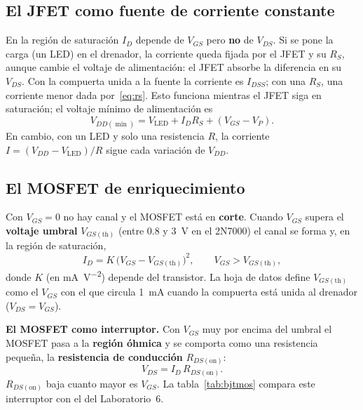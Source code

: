 \documentclass[11pt,a4paper]{article}
\begin{document}
\subsection{El JFET como fuente de corriente constante}
\label{sec:fuente}
En la región de saturación $I_D$ depende de $V_{GS}$ pero \textbf{no} de $V_{DS}$. Si se pone
la carga (un LED) en el drenador, la corriente queda fijada por el JFET y su $R_S$, aunque cambie
el voltaje de alimentación: el JFET absorbe la diferencia en su $V_{DS}$. Con la compuerta
unida a la fuente la corriente es $I_{DSS}$; con una $R_S$, una corriente menor dada
por~\eqref{eq:rs}. Esto funciona mientras el JFET siga en saturación; el voltaje mínimo de
alimentación es
\begin{equation}
  V_{DD(\min)} = V_{\text{LED}} + I_D R_S + (V_{GS} - V_P).
  \label{eq:vddmin}
\end{equation}
En cambio, con un LED y solo una resistencia $R$, la corriente
$I = (V_{DD} - V_{\text{LED}})/R$ sigue cada variación de $V_{DD}$.

\subsection{El MOSFET de enriquecimiento}
Con $V_{GS} = 0$ no hay canal y el MOSFET está en \textbf{corte}. Cuando $V_{GS}$ supera el
\textbf{voltaje umbral} $V_{GS(\text{th})}$ (entre \num{0.8} y \qty{3}{\volt} en el 2N7000) el
canal se forma y, en la región de saturación,
\begin{equation}
  I_D = K\,\bigl(V_{GS} - V_{GS(\text{th})}\bigr)^{2},
  \qquad V_{GS} > V_{GS(\text{th})},
  \label{eq:mos}
\end{equation}
donde $K$ (en \unit{\milli\ampere\per\volt\squared}) depende del transistor. La hoja de datos
define $V_{GS(\text{th})}$ como el $V_{GS}$ con el que circula \qty{1}{\milli\ampere} cuando la
compuerta está unida al drenador ($V_{DS} = V_{GS}$).

\noindent\textbf{El MOSFET como interruptor.} Con $V_{GS}$ muy por encima del umbral el
MOSFET pasa a la \textbf{región óhmica} y se comporta como una resistencia pequeña, la
\textbf{resistencia de conducción} $R_{DS(\text{on})}$:
\begin{equation}
  V_{DS} = I_D\,R_{DS(\text{on})}.
  \label{eq:rdson}
\end{equation}
$R_{DS(\text{on})}$ baja cuanto mayor es $V_{GS}$. La tabla~\ref{tab:bjtmos} compara este
interruptor con el del Laboratorio~6.
\end{document}
